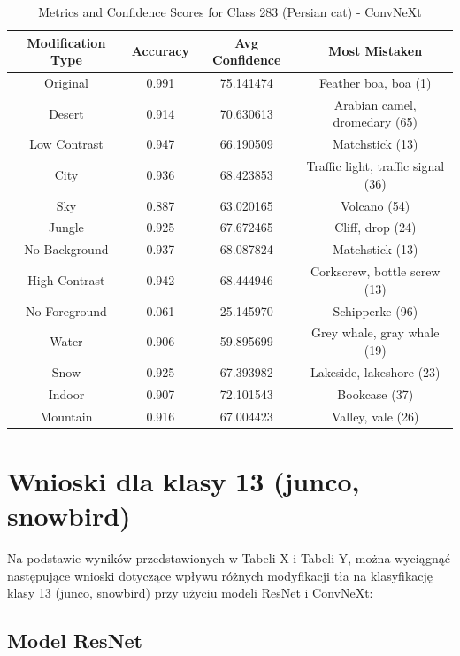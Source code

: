 \begin{table}
	\centering
	\begin{tabular}{|c|c|c|c|}
		\hline
		\textbf{Modification Type} & \textbf{Accuracy} & \textbf{Avg Confidence} & \textbf{Most Mistaken} \\
		\hline
		Original & 0.991 & 75.141474 & Feather boa, boa (1) \\
		\hline
		Desert & 0.914 & 70.630613 & Arabian camel, dromedary (65) \\
		\hline
		Low Contrast & 0.947 & 66.190509 & Matchstick (13) \\
		\hline
		City & 0.936 & 68.423853 & Traffic light, traffic signal (36) \\
		\hline
		Sky & 0.887 & 63.020165 & Volcano (54) \\
		\hline
		Jungle & 0.925 & 67.672465 & Cliff, drop (24) \\
		\hline
		No Background & 0.937 & 68.087824 & Matchstick (13) \\
		\hline
		High Contrast & 0.942 & 68.444946 & Corkscrew, bottle screw (13) \\
		\hline
		No Foreground & 0.061 & 25.145970 & Schipperke (96) \\
		\hline
		Water & 0.906 & 59.895699 & Grey whale, gray whale (19) \\
		\hline
		Snow & 0.925 & 67.393982 & Lakeside, lakeshore (23) \\
		\hline
		Indoor & 0.907 & 72.101543 & Bookcase (37) \\
		\hline
		Mountain & 0.916 & 67.004423 & Valley, vale (26) \\
		\hline
	\end{tabular}
	\caption{Metrics and Confidence Scores for Class 283 (Persian cat) - ConvNeXt}
	\label{tab:metrics_confidence_class_283_convnext}
\end{table}

\section*{Wnioski dla klasy 13 (junco, snowbird)}

Na podstawie wyników przedstawionych w Tabeli X i Tabeli Y, można wyciągnąć następujące wnioski dotyczące wpływu różnych modyfikacji tła na klasyfikację klasy 13 (junco, snowbird) przy użyciu modeli ResNet i ConvNeXt:

\subsection*{Model ResNet}


